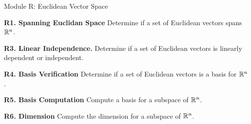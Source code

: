 
\begin{module}{Module R: Euclidean Vector Space}

\begin{moduleStandards}
  \item \textbf{R1. Spanning Euclidan Space}
        Determine if a set of Euclidean vectors spans \(\mathbb{R}^n\).
  \item \textbf{R3. Linear Independence.}
        Determine if a set of Euclidean vectors is linearly dependent or
        independent.
  \item \textbf{R4. Basis Verification}
        Determine if a set of Euclidean vectors is a basis for \(\mathbb{R}^n\).
  \item \textbf{R5. Basis Computation}
        Compute a basis for a subspace of \(\mathbb{R}^n\).
  \item \textbf{R6. Dimension}
        Compute the dimension for a subspace of \(\mathbb{R}^n\).
\end{moduleStandards}





\end{module}

